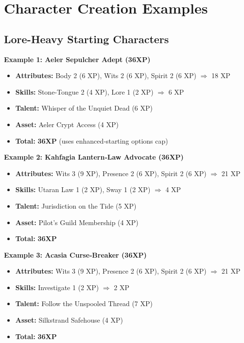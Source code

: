 \section{Character Creation Examples}\label{sec:creation_examples}

\subsection{Lore-Heavy Starting Characters}\label{subsec:starting_examples}

\textbf{Example 1: Aeler Sepulcher Adept (36XP)}
\begin{itemize}
    \item \textbf{Attributes:} Body 2 (6 XP), Wits 2 (6 XP), Spirit 2 (6 XP) $\Rightarrow$ 18 XP
    \item \textbf{Skills:} Stone‑Tongue 2 (4 XP), Lore 1 (2 XP) $\Rightarrow$ 6 XP
    \item \textbf{Talent:} Whisper of the Unquiet Dead (6 XP)
    \item \textbf{Asset:} Aeler Crypt Access (4 XP)
    \item \textbf{Total:} \textbf{36XP} (uses enhanced‑starting options cap)
\end{itemize}

\textbf{Example 2: Kahfagia Lantern‑Law Advocate (36XP)}
\begin{itemize}
    \item \textbf{Attributes:} Wits 3 (9 XP), Presence 2 (6 XP), Spirit 2 (6 XP) $\Rightarrow$ 21 XP
    \item \textbf{Skills:} Utaran Law 1 (2 XP), Sway 1 (2 XP) $\Rightarrow$ 4 XP
    \item \textbf{Talent:} Jurisdiction on the Tide (5 XP)
    \item \textbf{Asset:} Pilot's Guild Membership (4 XP)
    \item \textbf{Total:} \textbf{36XP}
\end{itemize}

\textbf{Example 3: Acasia Curse‑Breaker (36XP)}
\begin{itemize}
    \item \textbf{Attributes:} Wits 3 (9 XP), Presence 2 (6 XP), Spirit 2 (6 XP) $\Rightarrow$ 21 XP
    \item \textbf{Skills:} Investigate 1 (2 XP) $\Rightarrow$ 2 XP
    \item \textbf{Talent:} Follow the Unspooled Thread (7 XP)
    \item \textbf{Asset:} Silkstrand Safehouse (4 XP)
    \item \textbf{Total:} \textbf{36XP}
\end{itemize}

